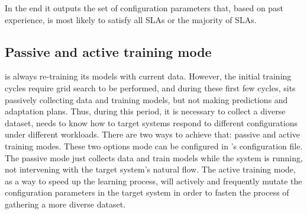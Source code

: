 In the end it outputs the set of configuration parameters that, based on past experience, is most likely to satisfy all SLAs or the majority of SLAs.

\subsection{Passive and active training mode}

\projectname{} is always re-training its models with current data. However, the initial training cycles require grid search to be performed, and during these first few cycles, \projectname{} sits passively collecting data and training models, but not making predictions and adaptation plans. Thus, during this period, it is necessary to collect a diverse dataset, \projectname{} needs to know how to target systems respond to different configurations under different workloads. There are two ways to achieve that: passive and active training modes. These two options mode can be configured in \projectname{}'s configuration file. The passive mode just collects data and train models while the system is running, not intervening with the target system's natural flow. The active training mode, as a way to speed up the learning process, \projectname{} will actively and frequently mutate the configuration parameters in the target system in order to fasten the process of gathering a more diverse dataset.






